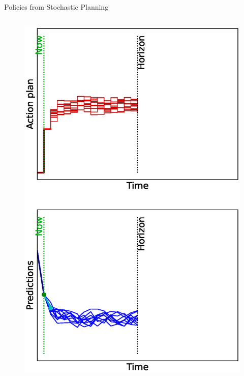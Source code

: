 \documentclass[lecture]{beamer}
\begin{document}
\begin{frame}{\normalsize Policies from Stochastic Planning}
\begin{columns}
\begin{overlayarea}{\textwidth}{0.9\textheight}
\begin{figure}
{          \includegraphics[width=\FS\textwidth,clip]{Codes/MPC/MPCMCWRONG1.eps}
        }%
        {%
}
\end{figure}
\end{overlayarea}
\end{columns}
\end{frame}
\end{document}
